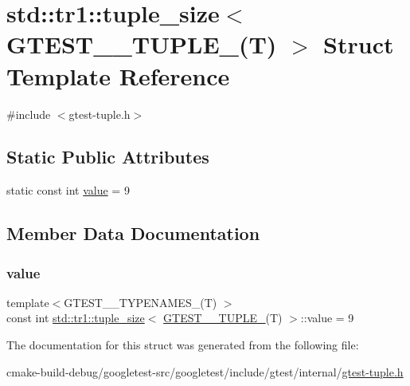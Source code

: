 \hypertarget{structstd_1_1tr1_1_1tuple__size_3_01GTEST__9__TUPLE___07T_08_01_4}{}\section{std\+::tr1\+::tuple\+\_\+size$<$ G\+T\+E\+S\+T\+\_\+\_\+\+T\+U\+P\+L\+E\+\_\+(T) $>$ Struct Template Reference}
\label{structstd_1_1tr1_1_1tuple__size_3_01GTEST__9__TUPLE___07T_08_01_4}


{\ttfamily \#include $<$gtest-\/tuple.\+h$>$}

\subsection*{Static Public Attributes}
\begin{DoxyCompactItemize}
\item 
static const int \mbox{\hyperlink{structstd_1_1tr1_1_1tuple__size_3_01GTEST__9__TUPLE___07T_08_01_4_aea347b00f3a9643d02e322d5cc6648e4}{value}} = 9
\end{DoxyCompactItemize}


\subsection{Member Data Documentation}
\mbox{\label{structstd_1_1tr1_1_1tuple__size_3_01GTEST__9__TUPLE___07T_08_01_4_aea347b00f3a9643d02e322d5cc6648e4}} 
\subsubsection{\texorpdfstring{value}{value}}
{\footnotesize\ttfamily template$<$G\+T\+E\+S\+T\+\_\+\_\+\+T\+Y\+P\+E\+N\+A\+M\+E\+S\+\_\+(\+T) $>$ \\
const int \mbox{\hyperlink{structstd_1_1tr1_1_1tuple__size}{std\+::tr1\+::tuple\+\_\+size}}$<$ \mbox{\hyperlink{namespacestd_1_1tr1_ab4f2c7d5458171bec6c4330fc5c7aba6}{G\+T\+E\+S\+T\+\_\+\_\+\+T\+U\+P\+L\+E\+\_\+}}(T) $>$\+::value = 9\hspace{0.3cm}{\ttfamily [static]}}



The documentation for this struct was generated from the following file\+:\begin{DoxyCompactItemize}
\item 
cmake-\/build-\/debug/googletest-\/src/googletest/include/gtest/internal/\mbox{\hyperlink{gtest-tuple_8h}{gtest-\/tuple.\+h}}\end{DoxyCompactItemize}
